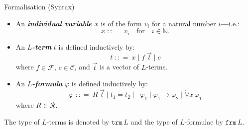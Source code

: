 \documentclass[serif,table,10pt]{beamer}
\newcommand{\IN}{\mathbb{N}}
\newcommand{\0}{\texttt{0}}
\newcommand{\1}{\texttt{1}}
\newcommand{\inlinedef}[1]{\emph{\textbf{#1}}}
\newcommand{\bnfis}{\mathrel{\;{:}{:}{=}\ }}
\newcommand{\bnfor}{\mathrel{\;\big|\; }}
\newcommand{\Leq}{\mathrel{\dot{=}}}
\newcommand{\Lneg}{\mathop{\dot{\neg}}}
\newcommand{\Lto}{\mathrel{\dot{\to}}}
\newcommand{\Lall}[1]{\dot{\forall}#1\,}
\begin{document}
\begin{frame}{Formalisation (Syntax)}

    \begin{itemize}
        \item An \inlinedef{individual variable} $x$ is of the form $v_i$ for a natural number $i$\textbf{---}i.e.: \[ x \bnfis v_i \quad \mathrm{for} \quad i \in \IN . \]
        \item An \inlinedef{$L$-term} $t$ is defined inductively by: \[t \bnfis x \bnfor f \; \vec{t} \bnfor c\] where $f \in \mathcal{F}$, $c \in \mathcal{C}$, and $\vec{t}$ is a vector of $L$-terms.
        \item An \inlinedef{$L$-formula} $\varphi$ is defined inductively by: \[\varphi \bnfis R \; \vec{t} \bnfor t_1 \Leq t_2 \bnfor \Lneg \varphi_1 \bnfor  \varphi_1  \Lto \varphi_2 \bnfor \Lall{x} \varphi_1\] where $R \in \mathcal{R}$.
    \end{itemize}

    The type of $L$-terms is denoted by $ \mathtt{trm} \, L $ and the type of $L$-formulae by $ \mathtt{frm} \, L $.

\end{frame}
\end{document}
